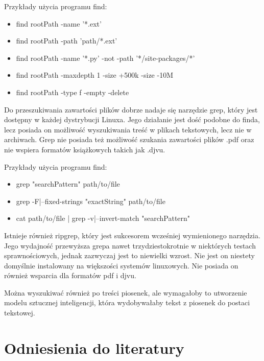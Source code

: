 Przykłady użycia programu find:
\begin{itemize} 
  \label{fig:find-example}
  \item find rootPath -name '*.ext'
  \item find rootPath -path 'path/*.ext' 
  \item find rootPath -name '*.py' -not -path '*/site-packages/*'
  \item find rootPath -maxdepth 1 -size +500k -size -10M
  \item find rootPath -type f -empty -delete
\end{itemize}

Do przeszukiwania zawartości plików dobrze nadaje się narzędzie grep, który jest
dostępny w każdej dystrybucji Linuxa. Jego działanie jest dość podobne do finda,
lecz posiada on możliwość wyszukiwania treść w plikach tekstowych, lecz nie w 
archiwach. Grep nie posiada też możliwość szukania zawartości plików .pdf oraz
nie wspiera formatów książkowych takich jak .djvu.

Przykłady użycia programu find:
\begin{itemize} 
  \label{fig:grep-example}
  \item grep "searchPattern" path/to/file
  \item grep -F|--fixed-strings "exactString" path/to/file
  \item cat path/to/file | grep -v|--invert-match "searchPattern"
\end{itemize}

Istnieje również ripgrep, który jest sukcesorem wcześniej wymienionego
narzędzia. Jego wydajność przewyższa grepa nawet trzydziestokrotnie w niektórych
testach sprawnościowych, jednak zazwyczaj jest to niewielki wzrost. Nie jest on
niestety domyślnie instalowany na większości systemów linuxowych. Nie posiada on
również wsparcia dla formatów pdf i djvu.

Można wyszukiwać również po treści piosenek, ale wymagałoby to utworzenie modelu
sztucznej inteligencji, która wydobywałaby tekst z piosenek do postaci tekstowej.

\section{Odniesienia do literatury}

